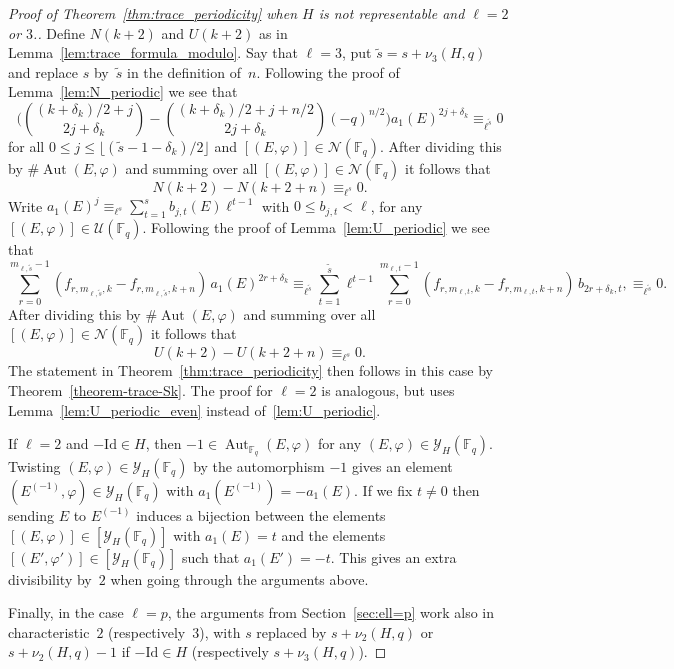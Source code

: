 \documentclass[10pt]{article}
\theoremstyle{definition}
\let\phi\varphi
\DeclareMathOperator\Aut{Aut}
\renewcommand{\:}{\colon}
\newcommand{\bF}{\mathbb{F}}
\newcommand{\F}{\mathbb{F}}
\begin{document}
\begin{proof}[Proof of Theorem~\ref{thm:trace_periodicity} when $H$ is not representable and $\ell=2$ or $3$.]
Define $N(k+2)$ and $U(k+2)$ as in Lemma~\ref{lem:trace_formula_modulo}. 
Say that $\ell=3$, put $\tilde s=s+\nu_3(H,q)$ and replace $s$ by~$\tilde s$ in the definition of~$n$. Following the proof of Lemma~\ref{lem:N_periodic} we see that
    \[
     \biggl(\binom{(k+\delta_k)/2+j}{2j+\delta_k}-\binom{(k+\delta_k)/2+j+n/2}{2j+\delta_k}
     (-q)^{n/2}\biggr) a_1(E)^{2j+\delta_k} \equiv_{\ell^{\tilde s}} 0
    \]
for all $0 \leq j \leq \lfloor (\tilde s-1-\delta_k)/2\rfloor$ and $[(E,\phi)] \in \mathcal N(\bF_q)$.
After dividing this by $\# \Aut(E,\phi)$ and summing over all $[(E,\phi)] \in \mathcal N(\bF_q)$ it follows that 
\[
N(k+2)-N(k+2+n) \equiv_{\ell^{s}} 0. 
\]
Write $a_1(E)^{j} \equiv_{\ell^s} \sum_{t=1}^s b_{j,t}(E) \ell^{t-1}$  with $0 \leq b_{j,t} < \ell$, for any $[(E,\phi)] \in \mathcal U(\bF_q)$. Following the proof of Lemma~\ref{lem:U_periodic} we see that 
\[
\sum_{r=0}^{m_{\ell,\tilde s}-1} (f_{r,m_{\ell, \tilde s},k}- f_{r,m_{\ell, \tilde s},k+n}) \,a_1(E)^{2r+\delta_k}     \equiv_{\ell^{\tilde s}} \sum_{t=1}^{\tilde s} \ell^{t-1} \sum_{r=0}^{m_{\ell,t}-1} (f_{r,m_{\ell,t},k}-f_{r,m_{\ell,t},k+n}) \,b_{2r+\delta_k,t},
\equiv_{\ell^{\tilde s}} 0.
\]
After dividing this by $\# \Aut(E,\phi)$ and summing over all $[(E,\phi)] \in \mathcal N(\bF_q)$ it follows that 
\[
U(k+2)-U(k+2+n) \equiv_{\ell^{s}} 0.
\]
The statement in Theorem~\ref{thm:trace_periodicity} then follows in this case by Theorem~\ref{theorem-trace-Sk}.
The proof for $\ell=2$ is analogous, but uses Lemma~\ref{lem:U_periodic_even} instead of~\ref{lem:U_periodic}. 

If $\ell=2$ and $-\mathrm{Id}\in H$, then $-1 \in \Aut_{\F_q}(E,\phi)$ for any $(E,\phi) \in \mathcal Y_H(\bF_q)$. 
Twisting $(E,\phi) \in \mathcal Y_H(\bF_q)$ by the automorphism $-1$ gives an element  $(E^{(-1)},\phi) \in \mathcal Y_H(\bF_q)$ with $a_1(E^{(-1)})=-a_1(E)$. If we fix $t \neq 0$ then sending $E$ to $E^{(-1)}$ induces a bijection between the elements $[(E,\phi)] \in [\mathcal Y_H(\bF_q)]$ with $a_1(E)=t$ and the elements $[(E',\phi')] \in [\mathcal Y_H(\bF_q)]$ such that $a_1(E')=-t$. 
This gives an extra divisibility by~$2$ when going through the arguments above. 

Finally, in the case $\ell = p$, the arguments from Section~\ref{sec:ell=p} work also in characteristic~$2$ (respectively~$3$), with $s$ replaced by $s+\nu_2(H,q)$ or $s + \nu_2(H,q)-1$ if $-\mathrm{Id} \in H$ (respectively $s+\nu_3(H,q)$).
\end{proof}
\end{document}
